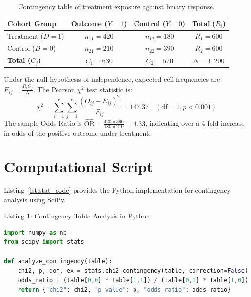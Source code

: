 \documentclass[12pt, a4paper]{article}
\begin{document}
\begin{table}[H]
    \centering
    \caption{Contingency table of treatment exposure against binary response.}
    \label{tab:contingency}
    \begin{tabular}{@{} l c c c @{}}
        \toprule
        \rowcolor{tableheader}
        \textbf{Cohort Group} & \textbf{Outcome ($Y=1$)} & \textbf{Control ($Y=0$)} & \textbf{Total ($R_i$)} \\
        \midrule
        Treatment ($D=1$)  & $n_{11} = 420$ & $n_{12} = 180$ & $R_1 = 600$ \\
        Control ($D=0$)    & $n_{21} = 210$ & $n_{22} = 390$ & $R_2 = 600$ \\
        \midrule
        \textbf{Total ($C_j$)} & $C_1 = 630$ & $C_2 = 570$ & $N = 1{,}200$ \\
        \bottomrule
    \end{tabular}
\end{table}

Under the null hypothesis of independence, expected cell frequencies are $E_{ij} = \frac{R_i C_j}{N}$. The Pearson $\chi^2$ test statistic is:
\begin{equation}
    \chi^2 = \sum_{i=1}^r \sum_{j=1}^c \frac{(O_{ij} - E_{ij})^2}{E_{ij}} = 147.37 \quad (\mathrm{df}=1, p < 0.001)
\end{equation}
The sample Odds Ratio is $\widehat{\mathrm{OR}} = \frac{420 \times 390}{180 \times 210} = 4.33$, indicating over a 4-fold increase in odds of the positive outcome under treatment.

\section{Computational Script}
Listing~\ref{lst:stat_code} provides the Python implementation for contingency analysis using SciPy.

\begin{statbox}[label={lst:stat_code}]{Listing 1: Contingency Table Analysis in Python}
\begin{lstlisting}[language=Python]
import numpy as np
from scipy import stats

def analyze_contingency(table):
    chi2, p, dof, ex = stats.chi2_contingency(table, correction=False)
    odds_ratio = (table[0,0] * table[1,1]) / (table[0,1] * table[1,0])
    return {"chi2": chi2, "p_value": p, "odds_ratio": odds_ratio}
\end{lstlisting}
\end{statbox}



\end{document}
